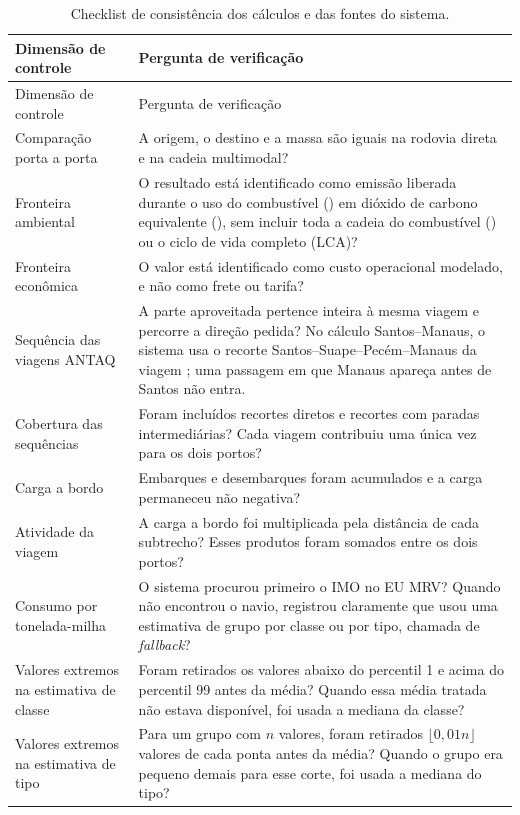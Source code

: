 \begingroup
\footnotesize
\setlength{\LTleft}{0pt}
\setlength{\LTright}{0pt}
\setlength{\tabcolsep}{4pt}
\renewcommand{\arraystretch}{1.10}
\begin{longtable}{L{0.29\textwidth}L{0.65\textwidth}}
\caption{Checklist de consistência dos cálculos e das fontes do sistema.}
\label{tab:app-checklist-metodologico}\\
\toprule
Dimensão de controle & Pergunta de verificação \\
\midrule
\endfirsthead
\toprule
Dimensão de controle & Pergunta de verificação \\
\midrule
\endhead
Comparação porta a porta & A origem, o destino e a massa são iguais na rodovia direta e na cadeia multimodal? \\
Fronteira ambiental & O resultado está identificado como emissão liberada durante o uso do combustível (\ttw{}) em dióxido de carbono equivalente (\cooe{}), sem incluir toda a cadeia do combustível (\wtw{}) ou o ciclo de vida completo (LCA)? \\
Fronteira econômica & O valor está identificado como custo operacional modelado, e não como frete ou tarifa? \\
Sequência das viagens ANTAQ & A parte aproveitada pertence inteira à mesma viagem e percorre a direção pedida? No cálculo Santos--Manaus, o sistema usa o recorte Santos--Suape--Pecém--Manaus da viagem ; uma passagem em que Manaus apareça antes de Santos não entra. \\
Cobertura das sequências & Foram incluídos recortes diretos e recortes com paradas intermediárias? Cada viagem contribuiu uma única vez para os dois portos? \\
Carga a bordo & Embarques e desembarques foram acumulados e a carga permaneceu não negativa? \\
Atividade da viagem & A carga a bordo foi multiplicada pela distância de cada subtrecho? Esses produtos foram somados entre os dois portos? \\
Consumo por tonelada-milha & O sistema procurou primeiro o IMO no EU MRV? Quando não encontrou o navio, registrou claramente que usou uma estimativa de grupo por classe ou por tipo, chamada de \emph{fallback}? \\
Valores extremos na estimativa de classe & Foram retirados os valores abaixo do percentil 1 e acima do percentil 99 antes da média? Quando essa média tratada não estava disponível, foi usada a mediana da classe? \\
Valores extremos na estimativa de tipo & Para um grupo com \(n\) valores, foram retirados \(\lfloor0{,}01n\rfloor\) valores de cada ponta antes da média? Quando o grupo era pequeno demais para esse corte, foi usada a mediana do tipo? \\

\end{longtable}

